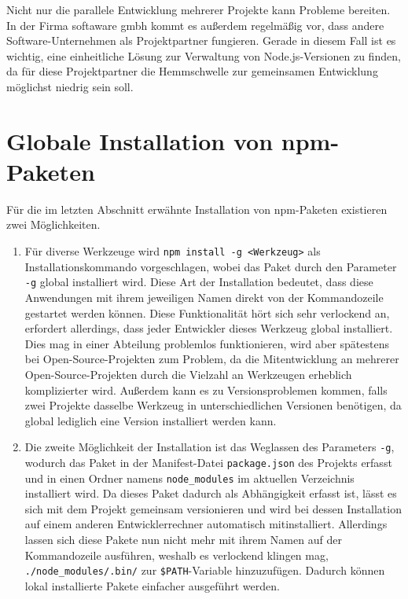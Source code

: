 Nicht nur die parallele Entwicklung mehrerer Projekte kann Probleme bereiten.
In der Firma softaware gmbh kommt es außerdem regelmäßig vor, dass andere Software-Unternehmen als Projektpartner fungieren.
Gerade in diesem Fall ist es wichtig, eine einheitliche Lösung zur Verwaltung von Node.js-Versionen zu finden, da für diese Projektpartner die Hemmschwelle zur gemeinsamen Entwicklung möglichst niedrig sein soll.


\section{Globale Installation von npm-Paketen}
\label{sec:global-package-installation}
Für die im letzten Abschnitt erwähnte Installation von npm-Paketen existieren zwei Möglichkeiten.

\begin{enumerate}
    \item Für diverse Werkzeuge wird \verb|npm install -g <Werkzeug>| als Installationskommando vorgeschlagen, wobei das Paket durch den Parameter \verb|-g| global installiert wird.
    Diese Art der Installation bedeutet, dass diese Anwendungen mit ihrem jeweiligen Namen direkt von der Kommandozeile gestartet werden können.
    Diese Funktionalität hört sich sehr verlockend an, erfordert allerdings, dass jeder Entwickler dieses Werkzeug global installiert.
    Dies mag in einer Abteilung problemlos funktionieren, wird aber spätestens bei Open-Source-Projekten zum Problem, da die Mitentwicklung an mehrerer Open-Source-Projekten durch die Vielzahl an Werkzeugen erheblich komplizierter wird.
    Außerdem kann es zu Versionsproblemen kommen, falls zwei Projekte dasselbe Werkzeug in unterschiedlichen Versionen benötigen, da global lediglich eine Version installiert werden kann.
\item Die zweite Möglichkeit der Installation ist das Weglassen des Parameters \verb|-g|, wodurch das Paket in der Manifest-Datei \verb|package.json| des Projekts erfasst und in einen Ordner namens \verb|node_modules| im aktuellen Verzeichnis installiert wird.
    Da dieses Paket dadurch als Abhängigkeit erfasst ist, lässt es sich mit dem Projekt gemeinsam versionieren und wird bei dessen Installation auf einem anderen Entwicklerrechner automatisch mitinstalliert.
    Allerdings lassen sich diese Pakete nun nicht mehr mit ihrem Namen auf der Kommandozeile ausführen, weshalb es verlockend klingen mag, \verb|./node_modules/.bin/| zur \verb|$PATH|-Variable hinzuzufügen.
    Dadurch können lokal installierte Pakete einfacher ausgeführt werden.

\end{enumerate}
